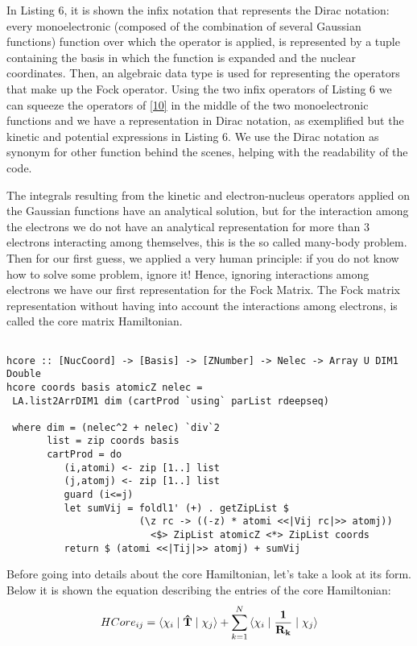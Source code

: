 \documentclass{tmr}
\begin{document}
In Listing 6, it is shown the infix notation that represents the Dirac notation:
every monoelectronic (composed of the combination of several Gaussian functions) 
function over which the operator is applied,
is represented by a tuple containing the basis in which the function is expanded 
and the nuclear coordinates. Then, an algebraic data type is used for representing the
operators that make up the Fock operator. Using the two infix operators of Listing 6
we can squeeze the operators of \eqref{10} in the middle of the
two monoelectronic functions and we have a representation in Dirac notation, as exemplified
but the kinetic and potential expressions in Listing 6. We use the Dirac notation as
synonym for other function behind the scenes, helping with the readability of the code.

The integrals resulting from the kinetic and electron-nucleus operators applied on
the Gaussian functions have an analytical solution, but for the interaction among the electrons we do not have 
an analytical representation for more than 3 electrons interacting among themselves, this is the so called
many-body problem. Then for our first guess,
we applied a very human principle: if you do not know how to solve some problem, ignore it!
Hence, ignoring interactions among electrons we have our first representation for 
the Fock Matrix. The Fock matrix representation without having into account the 
interactions among electrons, is called the core matrix Hamiltonian.

\begin{lstlisting}[float,captionpos=b,belowcaptionskip=4pt, caption= Core Hamiltonian]

hcore :: [NucCoord] -> [Basis] -> [ZNumber] -> Nelec -> Array U DIM1 Double
hcore coords basis atomicZ nelec = 
 LA.list2ArrDIM1 dim (cartProd `using` parList rdeepseq)

 where dim = (nelec^2 + nelec) `div`2
       list = zip coords basis       
       cartProd = do
          (i,atomi) <- zip [1..] list
          (j,atomj) <- zip [1..] list
          guard (i<=j)
          let sumVij = foldl1' (+) . getZipList $
                       (\z rc -> ((-z) * atomi <<|Vij rc|>> atomj))
                         <$> ZipList atomicZ <*> ZipList coords
          return $ (atomi <<|Tij|>> atomj) + sumVij

\end{lstlisting}
 
\par Before going into details about the core Hamiltonian,
let's take a look at its form. Below it is shown the equation
describing the entries of the core Hamiltonian:
\begin{equation}\label{15}
HCore_{ij} =\braket{\chi_{i} \mid \mathbf{\hat T} \mid \chi_{j}} + 
\sum_{k=1}^{N} \braket{\chi_{i} \mid \mathbf{\frac{1}{R_{k}}} \mid \chi_{j}} 
\end{equation}
\end{document}
